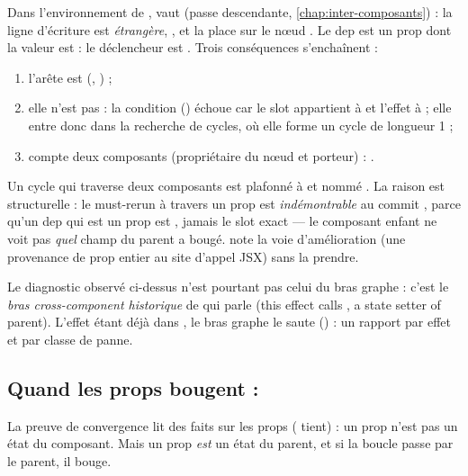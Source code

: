 Dans l'environnement de ,  vaut
 (passe descendante, \cref{chap:inter-composants}) : la
ligne d'écriture est \emph{étrangère}, , et  la
place sur le nœud . Le dep  est un prop dont la valeur est
 : le déclencheur est . Trois
conséquences s'enchaînent :
\begin{enumerate}
  \item l'arête est  (, ) ;
  \item elle n'est pas  : la condition 
        () échoue car le slot appartient à 
        et l'effet à  ; elle entre donc dans la recherche de cycles, où elle
        forme un cycle de longueur 1 ;
  \item {} compte deux composants (propriétaire du nœud et porteur) :
        .
\end{enumerate}

\begin{decision}
Un cycle qui traverse deux composants est plafonné à \Warning{} et nommé
. La raison est structurelle : le must-rerun
à travers un prop est \emph{indémontrable} au commit \snapshotCommit, parce qu'un dep
qui est un prop est , jamais le slot exact --- le composant enfant ne voit
pas \emph{quel} champ du parent a bougé.  note la voie d'amélioration (une
provenance de prop entier au site d'appel JSX) sans la prendre.
\end{decision}

Le diagnostic observé ci-dessus n'est pourtant pas celui du bras graphe : c'est le
\emph{bras cross-component historique} de  qui parle (\og this effect
calls , a state setter of parent\fg). L'effet étant déjà dans
, le bras graphe le saute
() : un rapport par effet et par classe de
panne.

\subsection{Quand les props bougent : }

La preuve de convergence lit des faits sur les props (\og {} tient\fg) : un prop n'est
pas un état du composant. Mais un prop \emph{est} un état du parent, et si la boucle passe
par le parent, il bouge.

